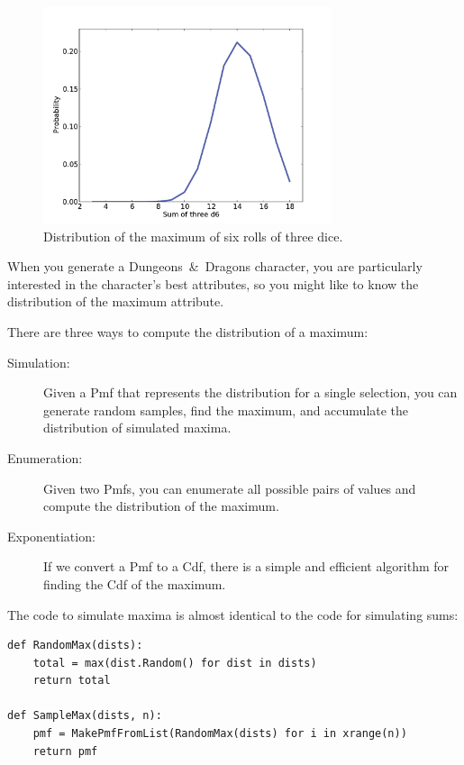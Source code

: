 \documentclass[12pt]{book}
\begin{document}
\begin{figure}
\centerline{\includegraphics[height=2.5in]{figs/dungeons2.pdf}}
\caption{Distribution of the maximum of six rolls of three dice.}
\label{fig.dungeons2}
\end{figure}

When you generate a Dungeons~\&~Dragons character, you are
particularly interested in the character's best attributes, so
you might like to know the
distribution of the maximum attribute.

There are three ways to compute the distribution of a maximum:

\begin{description}

\item[Simulation:] Given a Pmf that represents the distribution
for a single selection, you can generate random samples, find the maximum,
and accumulate the distribution of simulated maxima.

\item[Enumeration:] Given two Pmfs, you can enumerate all possible
pairs of values and compute the distribution of the maximum.

\item[Exponentiation:] If we convert a Pmf to a Cdf, there is a simple
and efficient algorithm for finding the Cdf of the maximum.

\end{description}

The code to simulate maxima is almost identical to the code for
simulating sums:

\begin{verbatim}
def RandomMax(dists):
    total = max(dist.Random() for dist in dists)
    return total

def SampleMax(dists, n):
    pmf = MakePmfFromList(RandomMax(dists) for i in xrange(n))
    return pmf
\end{verbatim}
\end{document}
